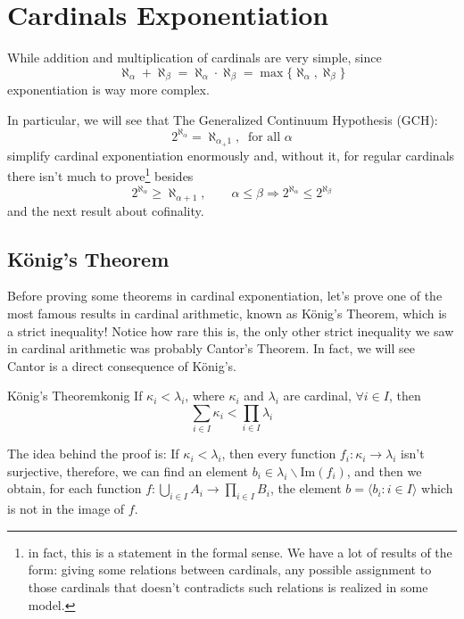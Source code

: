 \chapter{Cardinals Exponentiation}

While addition and multiplication of cardinals are very simple, since
$$\aleph_\alpha+\aleph_\beta=\aleph_\alpha\cdot\aleph_\beta=\max\{\aleph_\alpha,\aleph_\beta\}$$
exponentiation is way more complex.

In particular, we will see that The Generalized Continuum Hypothesis (GCH):
$$2^{\aleph_\alpha}=\aleph_{\alpha_+1},~\text{ for all }\alpha$$
simplify cardinal exponentiation enormously and, without it, for regular cardinals there isn't much to prove\footnote{in fact, this is a statement in the formal sense. We have a lot of results of the form: giving some relations between cardinals, any possible assignment to those cardinals that doesn't contradicts such relations is realized in some model.} besides
\begin{equation}\label{eq:2_exp}
    2^{\aleph_\alpha}\geq\aleph_{\alpha+1},\qquad\alpha\leq\beta\Rightarrow 2^{\aleph_\alpha}\leq2^{\aleph_\beta}
\end{equation}
and the next result about cofinality.

\section{König's Theorem}

Before proving some theorems in cardinal exponentiation, let's prove one of the most famous results in cardinal arithmetic, known as König's Theorem, which is a strict inequality! Notice how rare this is, the only other strict inequality we saw in cardinal arithmetic was probably Cantor's Theorem. In fact, we will see Cantor is a direct consequence of König's.

\begin{theorem}{König's Theorem}{konig}
    If $\kappa_i<\lambda_i$, where $\kappa_i$ and $\lambda_i$ are cardinal, $\forall i\in I$, then
    $$\sum_{i \in I}\kappa_i<\prod_{i\in I}\lambda_i$$
\end{theorem}

The idea behind the proof is: If $\kappa_i<\lambda_i$, then every function $f_i:\kappa_i\to\lambda_i$ isn't surjective, therefore, we can find an element $b_i\in\lambda_i\backslash\mathrm{Im}(f_i)$, and then we obtain, for each function $f:\bigcup_{i\in I}A_i\to\prod_{i\in I}B_i$, the element $b=\langle b_i:i\in I\rangle$ which is not in the image of $f$.


